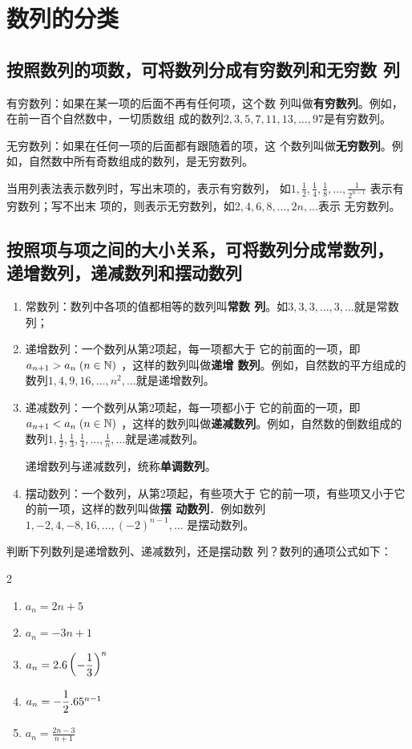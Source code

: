 \section{数列的分类}

\subsection*{按照数列的项数，可将数列分成有穷数列和无穷数
列}

有穷数列：如果在某一项的后面不再有任何项，这个数
列叫做\textbf{有穷数列}。例如，在前一百个自然数中，一切质数组
成的数列$2,3,5,7,11,13,\ldots,97$是有穷数列。

无穷数列：如果在任何一项的后面都有跟随着的项，这
个数列叫做\textbf{无穷数列}。例如，自然数中所有奇数组成的数列，是无穷数列。

当用列表法表示数列时，写出末项的，表示有穷数列，
如$1,\frac{1}{2},\frac{1}{4},\frac{1}{8},\ldots,\frac{1}{2^{n-1}}$
表示有穷数列；写不出末
项的，则表示无穷数列，如$2,4,6,8,\ldots,2n,\ldots$表示
无穷数列。

\subsection*{按照项与项之间的大小关系，可将数列分成常数列，
递增数列，递减数列和摆动数列}

\begin{enumerate}[(1)]
\item 常数列：数列中各项的值都相等的数列叫\textbf{常数
列}。如$3,3,3,\ldots,3,\ldots$就是常数列；
\item 递增数列：一个数列从第2项起，每一项都大于
它的前面的一项，即
$a_{n+1}>a_n\; (n\in\mathbb{N})$
，这样的数列叫做\textbf{递增
数列}。例如，自然数的平方组成的数列$1,4,9,16,\ldots,
n^2,\ldots$就是递增数列。
\item 递减数列：一个数列从第2项起，每一项都小于
它的前面的一项，即
$a_{n+1}<a_n\; (n\in\mathbb{N})$
，这样的数列叫做\textbf{递减数列}。例如，自然数的倒数组成的数列$1,\frac{1}{2},\frac{1}{3},\frac{1}{4},\ldots,\frac{1}{n},\ldots$就是递减数列。

递增数列与递减数列，统称\textbf{单调数列}。

\item 摆动数列：一个数列，从第2项起，有些项大于
它的前一项，有些项又小于它的前一项，这样的数列叫做\textbf{摆
动数列}．例如数列$1,-2,4,-8,16,\ldots, (-2)^{n-1},\ldots$
是摆动数列。
\end{enumerate}

\begin{example}
    判断下列数列是递增数列、递减数列，还是摆动数
列？数列的通项公式如下：
\begin{multicols}{2}
\begin{enumerate}[(1)]
\item $a_n=2n+5$
\item $a_n=-3n+1$
\item $a_n=2.6\left(-\dfrac{1}{3}\right)^n$
\item $a_n=-\dfrac{1}{2}.65^{n-1}$
\item $a_n=\frac{2n-3}{n+1}$
\end{enumerate}
\end{multicols}
\end{example}

